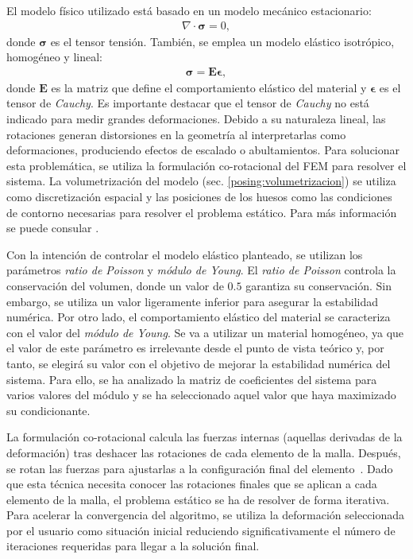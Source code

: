 
El modelo físico utilizado está basado en un modelo mecánico estacionario:
\begin{eqnarray}
\nabla \cdot \mathbf{\sigma} = 0,
\end{eqnarray}
donde $\mathbf{\sigma}$ es el tensor tensión. También, se emplea un modelo elástico isotrópico, homogéneo y lineal:  
\begin{eqnarray}
\mathbf{\sigma} = \mathbf{E}\mathbf{\epsilon}, 
\end{eqnarray}
donde $\mathbf{E}$ es la matriz que define el comportamiento elástico del material y $\mathbf{\epsilon}$ es el tensor de \emph{Cauchy}. Es importante destacar que el tensor de \emph{Cauchy} no está indicado para medir grandes deformaciones.  Debido a su naturaleza lineal, las rotaciones generan distorsiones en la geometría al interpretarlas como deformaciones, produciendo efectos de escalado o abultamientos. Para solucionar esta problemática, se utiliza la formulación co-rotacional del \ac{FEM} para resolver el sistema. La volumetrización del modelo (sec. \ref{posing:volumetrizacion}) se utiliza como discretización espacial y las posiciones de los huesos como las condiciones de contorno necesarias para resolver el problema estático. Para más información se puede consular \cite{Muller2004}.

Con la intención de controlar el modelo elástico planteado, se utilizan los parámetros \emph{ratio de Poisson} y \emph {módulo de Young}. El \emph{ratio de Poisson} controla la conservación del volumen, donde un valor de $0.5$ garantiza su conservación. Sin embargo,  se utiliza un valor ligeramente inferior para asegurar la estabilidad numérica. 
Por otro lado, el comportamiento elástico del material se caracteriza con el valor del \emph {módulo de Young}. Se va a utilizar un material homogéneo, ya que el valor de este parámetro es irrelevante desde el punto de vista teórico y, por tanto, se elegirá su valor con el objetivo de mejorar la estabilidad numérica del sistema. 
Para ello, se ha analizado la matriz de coeficientes del sistema para varios valores del módulo y se ha seleccionado aquel valor que haya maximizado su condicionante.

La formulación co-rotacional calcula las fuerzas internas (aquellas derivadas de la deformación) tras deshacer las rotaciones de cada elemento de la malla. Después, se rotan las fuerzas para ajustarlas a la configuración final del elemento~\cite{Muller2004}. Dado que esta técnica necesita conocer las rotaciones finales que se aplican a cada elemento de la malla, el problema estático se ha de resolver de forma iterativa. Para acelerar la convergencia del algoritmo, se utiliza la deformación seleccionada por el usuario como situación inicial reduciendo  significativamente el número de iteraciones requeridas para llegar a la solución final.  %


